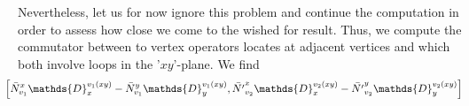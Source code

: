 \documentclass[12pt]{article}
\newcommand{\nn}{\nonumber}
\def\cl{{\cal L}}
\begin{document}
\begin{appendix}
Nevertheless, let us for now ignore this problem and continue the computation in order to assess how close we come to the wished for result. Thus, we compute the commutator between to vertex operators locates at adjacent vertices and which both involve loops in the '$xy$'-plane. We find
\begin{eqnarray}
&&\hspace{-0.8cm}\left[
\bar{N}_{v_1}^x \mathds{D}_x^{v_1(xy)} -  \bar{N}_{v_1}^y \mathds{D}_y^{v_1(xy)} , \bar{N'}_{v_2}^{x} \mathds{D}_x^{v_2(xy)} -  \bar{N'}_{v_2}^y \mathds{D}_y^{v_2(xy)} 
 \right]  \nn\\

\end{eqnarray}
\end{appendix}
\end{document}
